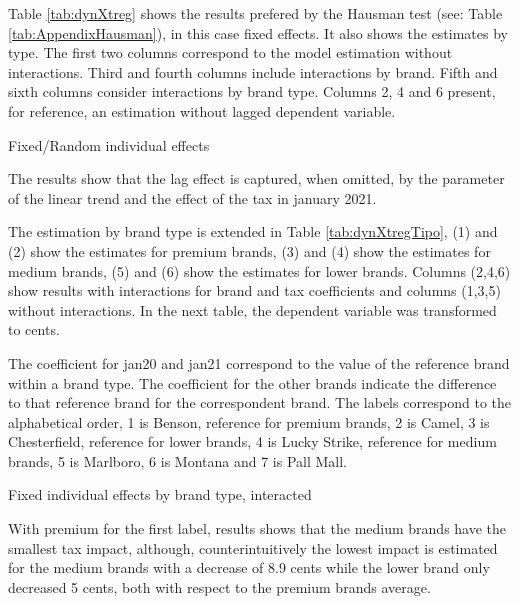 \documentclass[]{article}
\begin{document}
Table \ref{tab:dynXtreg} shows the results prefered by the Hausman test (see: Table \ref{tab:AppendixHausman}), in this case fixed effects. It  also shows the estimates by type. The first two columns correspond to the model estimation without interactions. Third and fourth columns include interactions by brand. Fifth and sixth columns consider interactions by brand type.
Columns 2, 4 and 6 present, for reference, an estimation without lagged dependent variable. 

	\begin{table}[ht]
		\centering
		\caption{Fixed/Random individual effects \label{tab:dynXtreg}} 
		
%
	\end{table}

The results show that the lag effect is captured, when omitted, by the parameter of the linear trend and the effect of the tax in january 2021.

The estimation by brand type is extended in Table \ref{tab:dynXtregTipo}, (1) and (2) show the estimates for premium brands, (3) and (4) show the estimates for medium brands, (5) and (6) show the estimates for lower brands.  Columns (2,4,6) show results with interactions for brand and tax coefficients and columns (1,3,5) without interactions.
In the next table, the dependent variable was transformed to cents.

The coefficient for jan20 and jan21 correspond to the value of the reference brand within a brand type.
The coefficient for the other brands indicate the difference to that reference brand for the correspondent brand. The labels correspond to the alphabetical order, 1 is Benson, reference for premium brands, 2 is Camel, 3 is Chesterfield, reference for lower brands, 4 is Lucky Strike, reference for medium brands, 5 is Marlboro, 6 is Montana and 7 is Pall Mall.

\begin{table}[ht]
	\centering
	\caption{Fixed individual effects by brand type, interacted \label{tab:dynXtregTipo}} 

%
\end{table}

With premium for the first label, results shows that the medium brands have the smallest tax impact, although, counterintuitively the lowest impact is estimated for the medium brands with a decrease of 8.9 cents while the lower brand only decreased 5 cents, both with respect to the premium brands average. 
\end{document}
